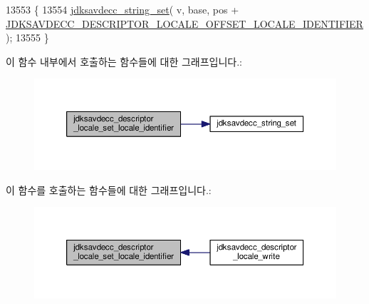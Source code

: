 \begin{DoxyCode}
13553 \{
13554     \hyperlink{group__string_gaffb2c926e982b532e0657e814afc0395}{jdksavdecc\_string\_set}( v, base, pos + 
      \hyperlink{group__descriptor__locale_gaad57dbf97564d1f30b2a411ab01c3149}{JDKSAVDECC\_DESCRIPTOR\_LOCALE\_OFFSET\_LOCALE\_IDENTIFIER} 
      );
13555 \}
\end{DoxyCode}


이 함수 내부에서 호출하는 함수들에 대한 그래프입니다.\+:
\nopagebreak
\begin{figure}[H]
\begin{center}
\leavevmode
\includegraphics[width=350pt]{group__descriptor__locale_ga7081f71b7ebc7e06cda7af8ea3ae1bcc_cgraph}
\end{center}
\end{figure}




이 함수를 호출하는 함수들에 대한 그래프입니다.\+:
\nopagebreak
\begin{figure}[H]
\begin{center}
\leavevmode
\includegraphics[width=350pt]{group__descriptor__locale_ga7081f71b7ebc7e06cda7af8ea3ae1bcc_icgraph}
\end{center}
\end{figure}


